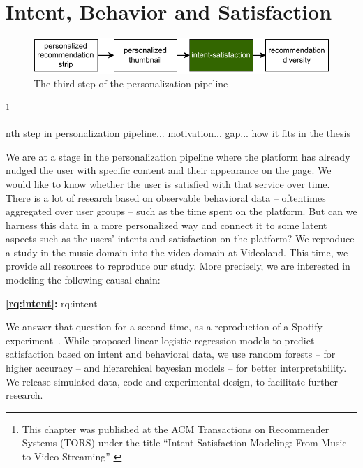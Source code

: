 
\chapter{Intent, Behavior and Satisfaction}
\label{chapter:research-intent}

\begin{figure}[ht]
  \centering
  \includegraphics{images/pipeline_step3.pdf}
  \caption{The third step of the personalization pipeline}
  \label{fig:pip3}
\end{figure}

\footnote[]{This chapter was published at the ACM Transactions on Recommender Systems (TORS) under the title ``Intent-Satisfaction Modeling: From Music to Video Streaming'' \citep{intent}}
\acresetall

nth step in personalization pipeline...
motivation...
gap...
how it fits in the thesis
\fi

We are at a stage in the personalization pipeline where the platform has already nudged the user with specific content and their appearance on the page. We would like to know whether the user is satisfied with that service over time. There is a lot of research based on observable behavioral data – oftentimes aggregated over user groups – such as the time spent on the platform. But can we harness this data in a more personalized way and connect it to some latent aspects such as the users' intents and satisfaction on the platform? We reproduce a study in the music domain into the video domain at Videoland. This time, we provide all resources to reproduce our study. More precisely, we are interested in modeling the following causal chain:


\medskip
\noindent
\textbf{\ref{rq:intent}:} \acl{rq:intent}
\medskip

We answer that question for a second time, as a reproduction of a Spotify experiment~\cite{spotifyIntent}. While \cite{spotifyIntent} proposed linear logistic regression models to predict satisfaction based on intent and behavioral data, we use random forests – for higher accuracy – and hierarchical bayesian models – for better interpretability. We release simulated data, code and experimental design, to facilitate further research.

